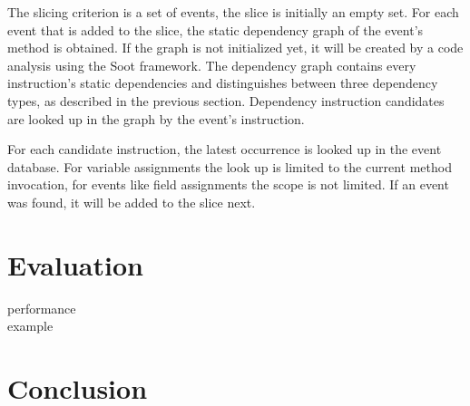 ﻿\documentclass[
      english,
      ]{llncs}
\begin{document}

The slicing criterion is a set of events, the slice is initially an empty set.
For each event that is added to the slice, the static dependency graph of the event's method is obtained.
If the graph is not initialized yet, it will be created by a code analysis using the Soot framework.
The dependency graph contains every instruction's static dependencies and distinguishes between three dependency types, as described in the previous section.
Dependency instruction candidates are looked up in the graph by the event's instruction.

For each candidate instruction, the latest occurrence is looked up in the event database.
For variable assignments the look up is limited to the current method invocation, for events like field assignments the scope is not limited.
If an event was found, it will be added to the slice next.








\section{Evaluation}
\label{sec:eval}

performance\\

example\\

\section{Conclusion}
\label{sec:conclusion}


\printbibliography
\end{document}
